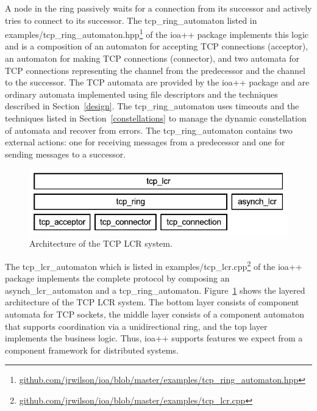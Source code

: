 A node in the ring passively waits for a connection from its successor and actively tries to connect to its successor.
The tcp\_ring\_automaton listed in examples/tcp\_ring\_automaton.hpp\footnote{\url{github.com/jrwilson/ioa/blob/master/examples/tcp_ring_automaton.hpp}} of the ioa++ package implements this logic and is a composition of an automaton for accepting TCP connections (acceptor), an automaton for making TCP connections (connector), and two automata for TCP connections representing the channel from the predecessor and the channel to the successor.
The TCP automata are provided by the ioa++ package and are ordinary automata implemented using file descriptors and the techniques described in Section~\ref{design}.
The tcp\_ring\_automaton uses timeouts and the techniques listed in Section~\ref{constellations} to manage the dynamic constellation of automata and recover from errors.
The tcp\_ring\_automaton contains two external actions:  one for receiving messages from a predecessor and one for sending messages to a successor.

\begin{figure}
\center
\includegraphics[width=\columnwidth]{tcp_lcr_automaton}
\caption{Architecture of the TCP LCR system.}
\label{tcp_lcr_automaton}
\end{figure}

The tcp\_lcr\_automaton which is listed in examples/tcp\_lcr.cpp\footnote{\url{github.com/jrwilson/ioa/blob/master/examples/tcp_lcr.cpp}} of the ioa++ package implements the complete protocol by composing an asynch\_lcr\_automaton and a tcp\_ring\_automaton.
Figure~\ref{tcp_lcr_automaton} shows the layered architecture of the TCP LCR system.
The bottom layer consists of component automata for TCP sockets, the middle layer consists of a component automaton that supports coordination via a unidirectional ring, and the top layer implements the business logic.
Thus, ioa++ supports features we expect from a component framework for distributed systems.


